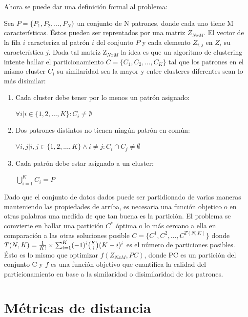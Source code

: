 Ahora se puede dar una definici\'on formal al problema:

Sea $P = \{ P_1, P_2, \dots , P_N\}$ un conjunto de N patrones, 
donde cada uno tiene M caracter\'isticas. Éstos pueden
ser reprentados por una matriz $Z_{NxM}$. El vector de la fila $i$ caracteriza al 
patr\'on $i$ del conjunto $P$ y cada elemento $Z_{i,j}$ en $Z_i$ su caracter\'istica $j$.
Dada tal matriz Z$_{NxM}$ la idea es que un algoritmo de clustering intente hallar
el particionamiento $C = \{ C_1, C_2, \dots , C_K \}$ tal que los patrones
en el mismo cluster $C_i$ su similaridad sea la mayor y entre clusteres diferentes
sean lo más disimilar:

\begin{enumerate}

\item Cada cluster debe tener por lo menos un patr\'on asignado:

$\forall i | i \in \{1, 2, \dots, K\} : C_i \neq \emptyset$

\item Dos patrones distintos no tienen ning\'un patr\'on en com\'un:

$\forall i,j | i,j\in \{1, 2, \dots, K\} \land i \neq j:  C_i \cap C_j \neq \emptyset$

\item Cada patr\'on debe estar asignado a un cluster:

$\bigcup_{i=1}^{K} C_i = P$

\end{enumerate}

Dado que el conjunto de datos dados puede ser partidionado de varias maneras
manteniendo las propiedades de arriba, es necesaria una función objetico o en otras palabras
una medida de que tan buena es la partici\'on. El problema se comvierte en hallar
una partici\'on $C^*$  \'optima o lo m\'as cercano a ella en comparaci\'on a 
las otras soluciones posible $C = \{ C^1, C^2, \dots, C^{T(N,K)} \}$ donde 
$T(N,K) = { {1 \over K!} \times {\sum_{i=1}^{K} (-1)^i  \binom{K}{i} (K-i)^i} }$
es el n\'umero de particiones posibles. \'Esto es lo mismo que optimizar $f(Z_{NxM}, PC)$,
donde PC es un partici\'on del conjunto C y $f$ es una funci\'on objetivo que
cuantifica la calidad del particionamiento en base a la similaridad o disimilaridad
de los patrones.

\section{M\'etricas de distancia} \label{sect:mdist}


